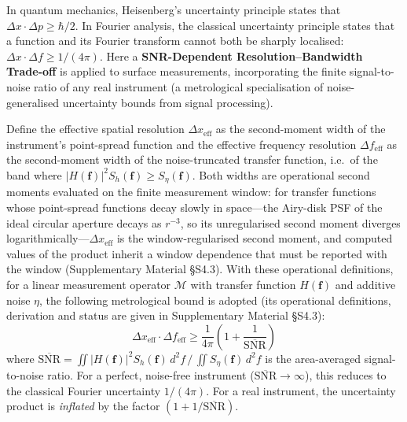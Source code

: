 \documentclass[review,12pt]{elsarticle}
\begin{document}
In quantum mechanics, Heisenberg's uncertainty principle states that $\Delta x \cdot \Delta p \geq \hbar/2$. In Fourier analysis, the classical uncertainty principle states that a function and its Fourier transform cannot both be sharply localised: $\Delta x \cdot \Delta f \geq 1/(4\pi)$. Here a \textbf{SNR-Dependent Resolution--Bandwidth Trade-off} is applied to surface measurements, incorporating the finite signal-to-noise ratio of any real instrument (a metrological specialisation of noise-generalised uncertainty bounds from signal processing).

Define the effective spatial resolution $\Delta x_\mathrm{eff}$ as the second-moment width of the instrument's point-spread function and the effective frequency resolution $\Delta f_\mathrm{eff}$ as the second-moment width of the noise-truncated transfer function, i.e.\ of the band where $|H(\mathbf{f})|^2 S_h(\mathbf{f}) \geq S_\eta(\mathbf{f})$. Both widths are operational second moments evaluated on the finite measurement window: for transfer functions whose point-spread functions decay slowly in space---the Airy-disk PSF of the ideal circular aperture decays as $r^{-3}$, so its unregularised second moment diverges logarithmically---$\Delta x_\mathrm{eff}$ is the window-regularised second moment, and computed values of the product inherit a window dependence that must be reported with the window (Supplementary Material \S S4.3). With these operational definitions, for a linear measurement operator $\mathcal{M}$ with transfer function $ H(\mathbf{f})$ and additive noise $\eta$, the following metrological bound is adopted (its operational definitions, derivation and status are given in Supplementary Material \S S4.3):
\begin{equation}
    \Delta x_\mathrm{eff} \cdot \Delta f_\mathrm{eff} \geq \frac{1}{4\pi}\left(1 + \frac{1}{\overline{\mathrm{SNR}}}\right)
    \label{eq:metrological_uncertainty}
\end{equation}
where $\overline{\mathrm{SNR}} = \iint |H(\mathbf{f})|^2 S_h(\mathbf{f}) \, d^2\!f \,/\, \iint S_\eta(\mathbf{f}) \, d^2\!f$ is the area-averaged signal-to-noise ratio. For a perfect, noise-free instrument ($\overline{\mathrm{SNR}} \to \infty$), this reduces to the classical Fourier uncertainty $1/(4\pi)$. For a real instrument, the uncertainty product is \emph{inflated} by the factor $(1 + 1/\overline{\mathrm{SNR}})$.
\end{document}
